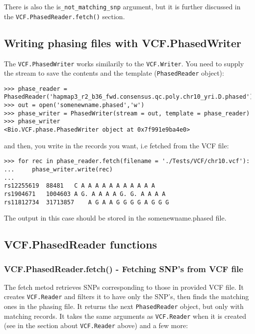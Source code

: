 \noindent There is also the is\verb|_not_matching_snp| argument, but it is further discussed in the \verb|VCF.PhasedReader.fetch()|
section.

\subsection{Writing phasing files with VCF.PhasedWriter}

\noindent The \verb|VCF.PhasedWriter| works similarily to the \verb|VCF.Writer|. You need to supply the stream to save the contents and
the template (\verb|PhasedReader| object):

\begin{verbatim}
>>> phase_reader = PhasedReader('hapmap3_r2_b36_fwd.consensus.qc.poly.chr10_yri.D.phased')
>>> out = open('somenewname.phased','w')
>>> phase_writer = PhasedWriter(stream = out, template = phase_reader)
>>> phase_writer
<Bio.VCF.phase.PhasedWriter object at 0x7f991e9ba4e0>
\end{verbatim}

\noindent and then, you write in the records you want, i.e fetched from the VCF file:

\begin{verbatim}
>>> for rec in phase_reader.fetch(filename = './Tests/VCF/chr10.vcf'):
...     phase_writer.write(rec)
...
rs12255619	88481	C A A A A A A A A A A A
rs1904671	1004603	A G. A A A A G. G. A A A A
rs11812734	31713857	A G A A G G G G A G G G

\end{verbatim}

\noindent The output in this case should be stored in the somenewname.phased file.

\subsection{VCF.PhasedReader functions}

\subsubsection{VCF.PhasedReader.fetch() - Fetching SNP's from VCF file}

\noindent The fetch metod retrieves SNPs corresponding to those in provided VCF file. It creates \verb|VCF.Reader|
and filters it to have only the SNP's, then finds the matching ones in the phasing file. It returns the next \verb|PhasedReader| object, but only with matching records.
It takes the same arguments as \verb|VCF.Reader| when it is created (see in the section about \verb|VCF.Reader| above) and a few more:

